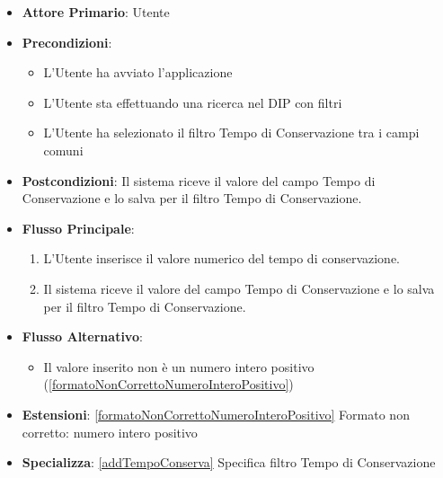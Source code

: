 \label{compilaValoreFiltroTempoDiConservazione}
\begin{itemize}
      \item \textbf{Attore Primario}: Utente
      \item \textbf{Precondizioni}: 
      \begin{itemize}
            \item L'Utente ha avviato l'applicazione
            \item L'Utente sta effettuando una ricerca nel DIP con filtri
            \item L'Utente ha selezionato il filtro Tempo di Conservazione tra i campi comuni
      \end{itemize}
      \item \textbf{Postcondizioni}: Il sistema riceve il valore del campo Tempo di Conservazione e lo salva per il filtro Tempo di Conservazione.
      \item \textbf{Flusso Principale}:
      \begin{enumerate}
            \item L'Utente inserisce il valore numerico del tempo di conservazione.
            \item Il sistema riceve il valore del campo Tempo di Conservazione e lo salva per il filtro Tempo di Conservazione.
      \end{enumerate}
      \item \textbf{Flusso Alternativo}:
      \begin{itemize}
            \item Il valore inserito non è un numero intero positivo (\ref{formatoNonCorrettoNumeroInteroPositivo})
      \end{itemize}
      \item \textbf{Estensioni}: \ref{formatoNonCorrettoNumeroInteroPositivo} Formato non corretto: numero intero positivo
      \item \textbf{Specializza}: \ref{addTempoConserva} Specifica filtro Tempo di Conservazione
\end{itemize}

